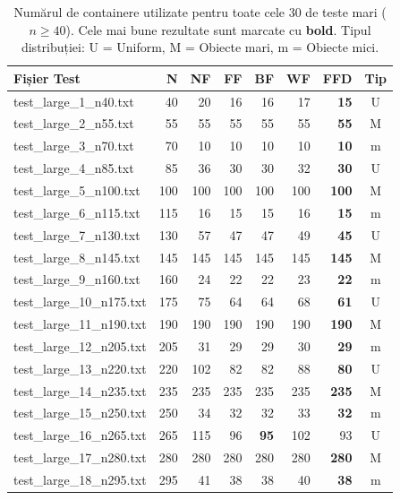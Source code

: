 \documentclass[runningheads]{llncs}
\begin{document}
\begin{table}[H]
\centering
\caption{Numărul de containere utilizate pentru toate cele 30 de teste mari ($n \geq 40$). Cele mai bune rezultate sunt marcate cu \textbf{bold}. Tipul distribuției: U = Uniform, M = Obiecte mari, m = Obiecte mici.}
\label{tab:bins_large}
\scriptsize
\begin{tabular}{|l|r|r|r|r|r|r|c|}
\hline
\textbf{Fișier Test} & \textbf{N} & \textbf{NF} & \textbf{FF} & \textbf{BF} & \textbf{WF} & \textbf{FFD} & \textbf{Tip} \\
\hline
test\_large\_1\_n40.txt & 40 & 20 & 16 & 16 & 17 & \textbf{15} & U \\
test\_large\_2\_n55.txt & 55 & 55 & 55 & 55 & 55 & \textbf{55} & M \\
test\_large\_3\_n70.txt & 70 & 10 & 10 & 10 & 10 & \textbf{10} & m \\
test\_large\_4\_n85.txt & 85 & 36 & 30 & 30 & 32 & \textbf{30} & U \\
test\_large\_5\_n100.txt & 100 & 100 & 100 & 100 & 100 & \textbf{100} & M \\
test\_large\_6\_n115.txt & 115 & 16 & 15 & 15 & 16 & \textbf{15} & m \\
test\_large\_7\_n130.txt & 130 & 57 & 47 & 47 & 49 & \textbf{45} & U \\
test\_large\_8\_n145.txt & 145 & 145 & 145 & 145 & 145 & \textbf{145} & M \\
test\_large\_9\_n160.txt & 160 & 24 & 22 & 22 & 23 & \textbf{22} & m \\
test\_large\_10\_n175.txt & 175 & 75 & 64 & 64 & 68 & \textbf{61} & U \\
test\_large\_11\_n190.txt & 190 & 190 & 190 & 190 & 190 & \textbf{190} & M \\
test\_large\_12\_n205.txt & 205 & 31 & 29 & 29 & 30 & \textbf{29} & m \\
test\_large\_13\_n220.txt & 220 & 102 & 82 & 82 & 88 & \textbf{80} & U \\
test\_large\_14\_n235.txt & 235 & 235 & 235 & 235 & 235 & \textbf{235} & M \\
test\_large\_15\_n250.txt & 250 & 34 & 32 & 32 & 33 & \textbf{32} & m \\
test\_large\_16\_n265.txt & 265 & 115 & 96 & \textbf{95} & 102 & 93 & U \\
test\_large\_17\_n280.txt & 280 & 280 & 280 & 280 & 280 & \textbf{280} & M \\
test\_large\_18\_n295.txt & 295 & 41 & 38 & 38 & 40 & \textbf{38} & m \\

\end{tabular}
\end{table}
\end{document}
